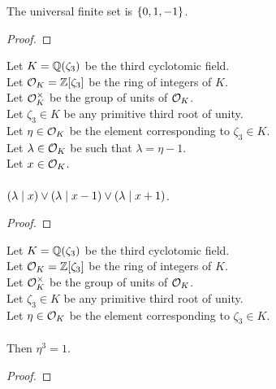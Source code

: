 \begin{lemma}
    \label{lmm:univ_quot}
    \leanok
    The universal finite set is $\left\{0, 1, -1\right\}$.
\end{lemma}
\begin{proof}
    \leanok
\end{proof}

\begin{lemma}
    \label{lmm:dvd_or_dvd_sub_one_or_dvd_add_one}
    \leanok
    Let $K = \mathbb{Q}(\zeta_3)$ be the third cyclotomic field. \\
    Let $\mathcal{O}_K = \mathbb{Z}[\zeta_3]$ be the ring of integers of $K$. \\
    Let $\mathcal{O}^\times_K$ be the group of units of $\mathcal{O}_K$. \\
    Let $\zeta_3 \in K$ be any primitive third root of unity. \\
    Let $\eta \in \mathcal{O}_K$ be the element corresponding to $\zeta_3 \in K$. \\
    Let $\lambda \in \mathcal{O}_K$ be such that $\lambda = \eta -1$. \\
    Let $x \in \mathcal{O}_K$. \\\\
    $(\lambda \mid x) \lor (\lambda \mid x-1) \lor (\lambda \mid x+1)$.
\end{lemma}
\begin{proof}
    \leanok
\end{proof}

\begin{lemma}
    \label{lmm:toInteger_cube_eq_one}
    \leanok
    Let $K = \mathbb{Q}(\zeta_3)$ be the third cyclotomic field. \\
    Let $\mathcal{O}_K = \mathbb{Z}[\zeta_3]$ be the ring of integers of $K$. \\
    Let $\mathcal{O}^\times_K$ be the group of units of $\mathcal{O}_K$. \\
    Let $\zeta_3 \in K$ be any primitive third root of unity. \\
    Let $\eta \in \mathcal{O}_K$ be the element corresponding to $\zeta_3 \in K$. \\\\
    Then $\eta^3 = 1$.
\end{lemma}
\begin{proof}
    \leanok
\end{proof}

